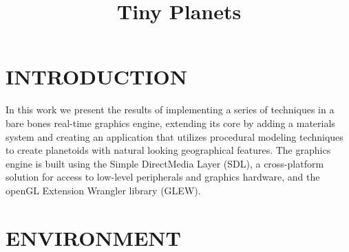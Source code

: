 \documentclass[a4paper,twoside]{article}
\begin{document}
\title{Tiny Planets}

\author{
}



\onecolumn \maketitle \normalsize \vfill

\section{\uppercase{Introduction}}
\label{sec:introduction}
\noindent In this work we present the results of implementing a series of techniques in a bare bones real-time graphics engine, extending its core by adding a materials system and creating an application that utilizes procedural modeling techniques to create planetoids with natural looking geographical features. The graphics engine is built using the Simple DirectMedia Layer (SDL), a cross-platform solution for access to low-level peripherals and graphics hardware, and the openGL Extension Wrangler library (GLEW).

\section{\uppercase{Environment}}
\label{sec:env}
\end{document}
